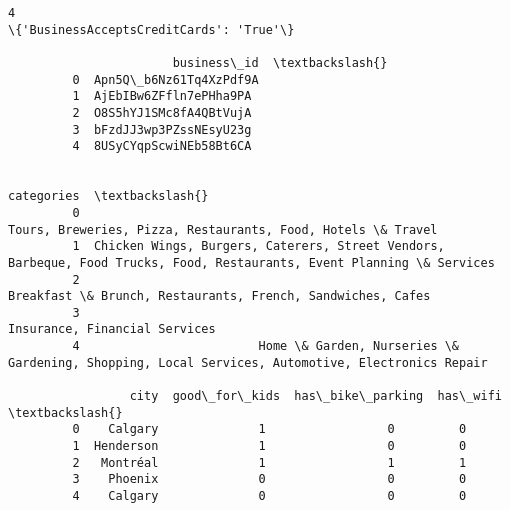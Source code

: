 \documentclass[11pt]{article}
\begin{document}
\begin{Verbatim}[commandchars=\\\{\}]
         4                                                                                                                                                                                                                                                                                                                                                                                                                                                                               \{'BusinessAcceptsCreditCards': 'True'\}   
         
                       business\_id  \textbackslash{}
         0  Apn5Q\_b6Nz61Tq4XzPdf9A   
         1  AjEbIBw6ZFfln7ePHha9PA   
         2  O8S5hYJ1SMc8fA4QBtVujA   
         3  bFzdJJ3wp3PZssNEsyU23g   
         4  8USyCYqpScwiNEb58Bt6CA   
         
                                                                                                                       categories  \textbackslash{}
         0                                                            Tours, Breweries, Pizza, Restaurants, Food, Hotels \& Travel   
         1  Chicken Wings, Burgers, Caterers, Street Vendors, Barbeque, Food Trucks, Food, Restaurants, Event Planning \& Services   
         2                                                             Breakfast \& Brunch, Restaurants, French, Sandwiches, Cafes   
         3                                                                                          Insurance, Financial Services   
         4                         Home \& Garden, Nurseries \& Gardening, Shopping, Local Services, Automotive, Electronics Repair   
         
                 city  good\_for\_kids  has\_bike\_parking  has\_wifi  \textbackslash{}
         0    Calgary              1                 0         0   
         1  Henderson              1                 0         0   
         2   Montréal              1                 1         1   
         3    Phoenix              0                 0         0   
         4    Calgary              0                 0         0   
         

\end{Verbatim}
\end{document}
